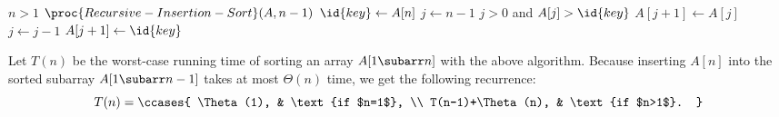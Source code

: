\indent\begin{codebox}
\li \If $n>1$
\li     \Then $\proc{Recursive-Insertion-Sort}(A,n-1)$
        \End
\li $\id{key}\gets A[n]$
\li $j\gets n-1$
\li \While $j>0$ and $A[j]>\id{key}$
\li     \Do $A[j+1]\gets A[j]$
\li         $j\gets j-1$
        \End
\li $A[j+1]\gets\id{key}$
\end{codebox}

Let $T(n)$ be the worst-case running time of sorting an array $A[1\subarr n]$ with the above algorithm.
Because inserting $A[n]$ into the sorted subarray $A[1\subarr n-1]$ takes at most $\Theta(n)$ time, we get the following recurrence:
\[
    T(n) =
    \ccases{
        \Theta(1), & \text{if $n=1$}, \\
        T(n-1)+\Theta(n), & \text{if $n>1$}.
    }
\]
